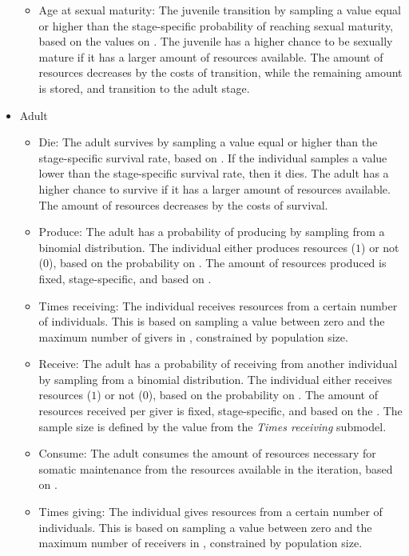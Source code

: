 \documentclass{article}
\begin{document}
\begin{itemize}
\begin{itemize}
        \item Age at sexual maturity: The juvenile transition by sampling a value equal or higher than the stage-specific probability of reaching sexual maturity, based on the values on \citep{ellison2017reproductive}. The juvenile has a higher chance to be sexually mature if it has a larger amount of resources available. The amount of resources decreases by the costs of transition, while the remaining amount is stored, and transition to the adult stage.
    \end{itemize}
    \item Adult
    \begin{itemize}
        \item Die: The adult survives by sampling a value equal or higher than the stage-specific survival rate, based on \cite{gurven2007longevity}. If the individual samples a value lower than the stage-specific survival rate, then it dies. The adult has a higher chance to survive if it has a larger amount of resources available. The amount of resources decreases by the costs of survival.
        \item Produce: The adult has a probability of producing by sampling from a binomial distribution. The individual either produces resources ($1$) or not ($0$), based on the probability on \cite{koster2020life}. The amount of resources produced is fixed, stage-specific, and based on \cite{koster2020life}.
        \item Times receiving: The individual receives resources from a certain number of individuals. This is based on sampling a value between zero and the maximum number of givers in \cite{gurven2004give}, constrained by population size.
        \item Receive: The adult has a probability of receiving from another individual by sampling from a binomial distribution. The individual either receives resources ($1$) or not ($0$), based on the probability on \cite{gurven2004give}. The amount of resources received per giver is fixed, stage-specific, and based on the \cite{gurven2004give}. The sample size is defined by the value from the \emph{Times receiving} submodel. 
        \item Consume: The adult consumes the amount of resources necessary for somatic maintenance from the resources available in the iteration, based on \cite{kaplan2000theory}.
        \item Times giving: The individual gives resources from a certain number of individuals. This is based on sampling a value between zero and the maximum number of receivers in \cite{gurven2004give}, constrained by population size.

\end{itemize}
\end{itemize}
\end{document}
